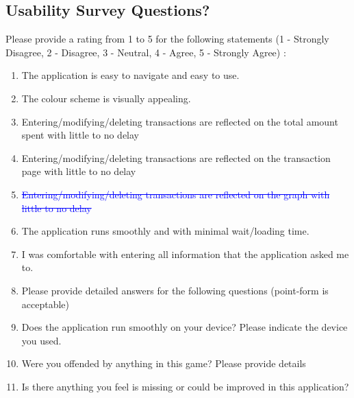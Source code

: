 \documentclass[12pt, titlepage]{article}
\begin{document}
\subsection{Usability Survey Questions?}  \label{survey:1}
Please provide a rating from 1 to 5 for the following statements (1 - Strongly Disagree, 2 - Disagree, 3 - Neutral, 4 - Agree, 5 - Strongly Agree) : 
\begin{enumerate}

\item The application is easy to navigate and easy to use. \label{question:q0}
\item The colour scheme is visually appealing.\label{question:q1}
\item Entering/modifying/deleting transactions are reflected on the total amount spent with little to no delay\label{question:q2}
\item Entering/modifying/deleting transactions are reflected on the transaction page with little to no delay\label{question:q3}
\item \textcolor{blue}{\st{Entering/modifying/deleting transactions are reflected on the graph with little to no delay}}\label{question:q4}
\item The application runs smoothly and with minimal wait/loading time.\label{question:q5}
\item I was comfortable with entering all information that the application asked me to.\label{question:q6}
\item Please provide detailed answers for the following questions (point-form is acceptable)\label{question:q7}
\item Does the application run smoothly on your device? Please indicate the device you used.\label{question:q8}
\item Were you offended by anything in this game? Please provide details\label{question:q9}
\item Is there anything you feel is missing or could be improved in this application?\label{question:q10}
\end{enumerate}
\end{document}
